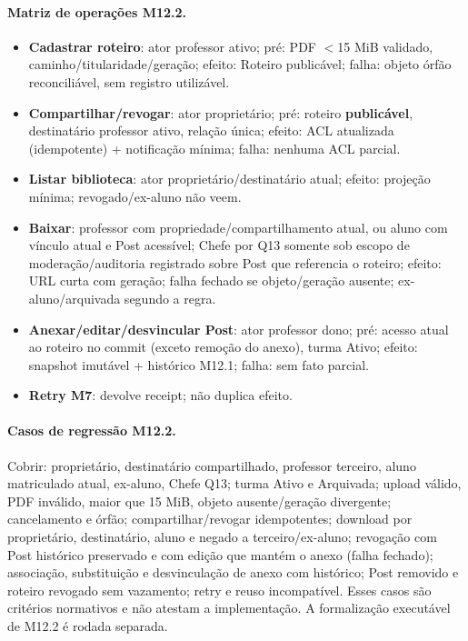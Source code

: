 \paragraph{Matriz de operações M12.2.}
\begin{itemize}
	\item \textbf{Cadastrar roteiro}: ator professor ativo; pré: PDF $<$15 MiB
	validado, caminho/titularidade/geração; efeito: Roteiro publicável; falha:
	objeto órfão reconciliável, sem registro utilizável.
	\item \textbf{Compartilhar/revogar}: ator proprietário; pré: roteiro
	\textbf{publicável}, destinatário professor ativo, relação única; efeito: ACL
	atualizada (idempotente) + notificação mínima; falha: nenhuma ACL parcial.
	\item \textbf{Listar biblioteca}: ator proprietário/destinatário atual;
	efeito: projeção mínima; revogado/ex-aluno não veem.
	\item \textbf{Baixar}: professor com propriedade/compartilhamento atual, ou
	aluno com vínculo atual e Post acessível; Chefe por Q13 somente sob escopo de
	moderação/auditoria registrado sobre Post que referencia o roteiro; efeito: URL curta
	com geração; falha fechado se objeto/geração ausente; ex-aluno/arquivada
	segundo a regra.
	\item \textbf{Anexar/editar/desvincular Post}: ator professor dono; pré:
	acesso atual ao roteiro no commit (exceto remoção do anexo), turma Ativo;
	efeito: snapshot imutável + histórico M12.1; falha: sem fato parcial.
	\item \textbf{Retry M7}: devolve receipt; não duplica efeito.
\end{itemize}

\paragraph{Casos de regressão M12.2.}
Cobrir: proprietário, destinatário compartilhado, professor terceiro, aluno
matriculado atual, ex-aluno, Chefe Q13; turma Ativo e Arquivada; upload válido,
PDF inválido, maior que 15 MiB, objeto ausente/geração divergente; cancelamento
e órfão; compartilhar/revogar idempotentes; download por proprietário,
destinatário, aluno e negado a terceiro/ex-aluno; revogação com Post histórico
preservado e com edição que mantém o anexo (falha fechado); associação,
substituição e desvinculação de anexo com histórico; Post removido e roteiro
revogado sem vazamento; retry e reuso incompatível. Esses casos são critérios
normativos e não atestam a implementação. A formalização executável de M12.2 é
rodada separada.

